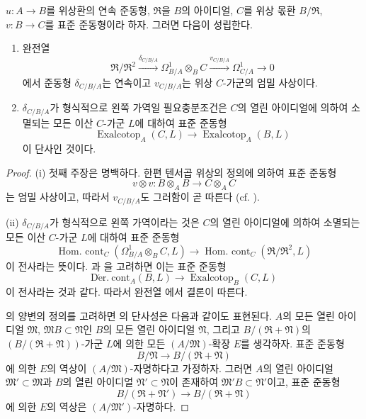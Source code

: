 \begin{proposition}[20.7.8]
\label{0.20.7.8-ko}
$u:A\to B$를 위상환의 연속 준동형, $\mathfrak R$을 $B$의 아이디얼,
$C$를 위상 몫환 $B/\mathfrak R$, $v:B\to C$를 표준 준동형이라 하자.
그러면 다음이 성립한다.
\begin{enumerate}
  \item[\rm(i)] 완전열 
\[
  \mathfrak R/\mathfrak R^2\xrightarrow{\delta_{C/B/A}}
  \Omega^1_{B/A}\otimes_B C\xrightarrow{v_{C/B/A}}
  \Omega^1_{C/A}\to0
\]
  에서 준동형 $\delta_{C/B/A}$는 연속이고 $v_{C/B/A}$는 위상
  $C$-가군의 엄밀 사상이다.
  \item[\rm(ii)] $\delta_{C/B/A}$가 형식적으로 왼쪽 가역일
   필요충분조건은 $C$의 열린 아이디얼에 의하여
  소멸되는 모든 이산 $C$-가군 $L$에 대하여 표준 준동형
\begin{equation}
\tag{20.7.8.1}
\label{0.20.7.8.1-ko}
  \operatorname{Exalcotop}_A(C,L)\longrightarrow
  \operatorname{Exalcotop}_A(B,L)
\end{equation}
  이 단사인 것이다.
\end{enumerate}
\end{proposition}

\begin{proof}
(i) 첫째 주장은 명백하다. 한편 텐서곱 위상의 정의에 의하여 표준
준동형
\[
  v\otimes v:B\otimes_A B\longrightarrow C\otimes_A C
\]
는 엄밀 사상이고, 따라서 $v_{C/B/A}$도 그러함이 곧 따른다
(cf. ).

(ii) $\delta_{C/B/A}$가 형식적으로 왼쪽 가역이라는 것은 $C$의 열린
아이디얼에 의하여 소멸되는 모든 이산 $C$-가군 $L$에 대하여 표준
준동형
\[
  \operatorname{Hom.\ cont}_C(\Omega^1_{B/A}\otimes_B C,L)
  \longrightarrow
  \operatorname{Hom.\ cont}_C(\mathfrak R/\mathfrak R^2,L)
\]
이 전사라는 뜻이다. 과
을 고려하면 이는 표준 준동형
\[
  \operatorname{D\acute{e}r.\ cont}_A(B,L)\longrightarrow
  \operatorname{Exalcotop}_B(C,L)
\]
이 전사라는 것과 같다. 따라서 완전열 에서 결론이
따른다.

의 양변의 정의를 고려하면
의 단사성은 다음과 같이도 표현된다. $A$의 모든
열린 아이디얼 $\mathfrak M$, $\mathfrak MB\subset\mathfrak N$인
$B$의 모든 열린 아이디얼 $\mathfrak N$, 그리고
$B/(\mathfrak R+\mathfrak N)$의
$(B/(\mathfrak R+\mathfrak N))$-가군 $L$에 의한 모든
$(A/\mathfrak M)$-확장 $E$를 생각하자. 표준 준동형
\[
  B/\mathfrak N\longrightarrow B/(\mathfrak R+\mathfrak N)
\]
에 의한 $E$의 역상이 $(A/\mathfrak M)$-자명하다고 가정하자. 그러면
$A$의 열린 아이디얼 $\mathfrak M'\subset\mathfrak M$과
$B$의 열린 아이디얼 $\mathfrak N'\subset\mathfrak N$이 존재하여
$\mathfrak M'B\subset\mathfrak N'$이고, 표준 준동형
\[
  B/(\mathfrak R+\mathfrak N')\longrightarrow
  B/(\mathfrak R+\mathfrak N)
\]
에 의한 $E$의 역상은 $(A/\mathfrak M')$-자명하다.
\end{proof}

